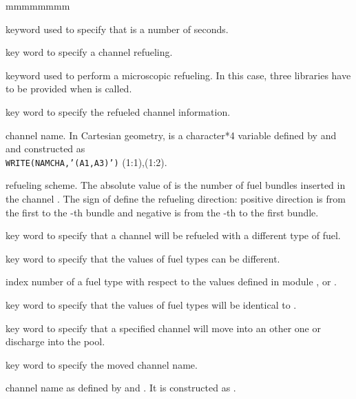 \begin{ListeDeDescription}{mmmmmmmm}
\item[\moc{SECOND}] keyword used to specify that  is a number of seconds.

\item[\moc{REFUEL}] key word to specify a channel refueling.

\item[\moc{MICRO}] keyword used to perform a microscopic refueling. In this case, three libraries have to be provided when  is called.

\item[\moc{CHAN}] key word to specify the refueled channel information.

\item[\dusa{NAMCHA}] channel name. In Cartesian geometry,  is a character*4 variable defined by  and
 and constructed as \\
{\tt WRITE(NAMCHA,'(A1,A3)')} (1:1),(1:2).

\item[\dusa{nsh}] refueling scheme. The absolute value of  is
the number of fuel bundles inserted in the channel .
The sign of  define the refueling direction: positive direction
is from the first to the -th bundle and negative is from the 
-th to the first bundle.

\item[\moc{NEWFUEL}] key word to specify that a channel will be refueled
with a different type of fuel.

\item[\moc{SOME}] key word to specify that the  values of
fuel types can be different.

\item[\dusa{imix}(i)] index number of a fuel type with respect to the
values defined in module ,  or .

\item[\moc{ALL}] key word to specify that the  values of
fuel types will be identical to .

\item[\moc{SHUFF}] key word to specify that a specified channel will
move into an other one or discharge into the pool.

\item[\moc{CHAN}] key word to specify the moved channel name.

\item[\dusa{NMCHA1}] channel name as defined by  and
. It is constructed as . 


\end{ListeDeDescription}
